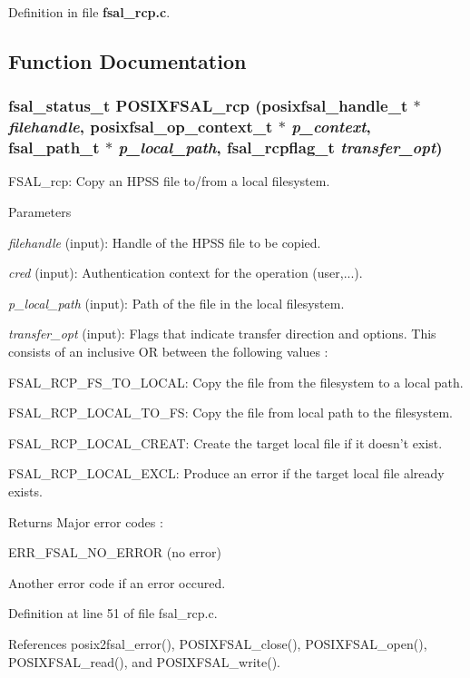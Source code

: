 Definition in file {\bf fsal\_\-rcp.c}.

\subsection{Function Documentation}
\subsubsection[{POSIXFSAL\_\-rcp}]{\setlength{\rightskip}{0pt plus 5cm}fsal\_\-status\_\-t POSIXFSAL\_\-rcp (posixfsal\_\-handle\_\-t $\ast$ {\em filehandle}, \/  posixfsal\_\-op\_\-context\_\-t $\ast$ {\em p\_\-context}, \/  fsal\_\-path\_\-t $\ast$ {\em p\_\-local\_\-path}, \/  fsal\_\-rcpflag\_\-t {\em transfer\_\-opt})}\label{fsal__rcp_8c_aaca81037c1994935b9526f730dd8ea38}
FSAL\_\-rcp: Copy an HPSS file to/from a local filesystem.


\begin{DoxyParams}{Parameters}
\item[{\em filehandle}](input): Handle of the HPSS file to be copied. \item[{\em cred}](input): Authentication context for the operation (user,...). \item[{\em p\_\-local\_\-path}](input): Path of the file in the local filesystem. \item[{\em transfer\_\-opt}](input): Flags that indicate transfer direction and options. This consists of an inclusive OR between the following values :
\begin{DoxyItemize}
\item FSAL\_\-RCP\_\-FS\_\-TO\_\-LOCAL: Copy the file from the filesystem to a local path.
\item FSAL\_\-RCP\_\-LOCAL\_\-TO\_\-FS: Copy the file from local path to the filesystem.
\item FSAL\_\-RCP\_\-LOCAL\_\-CREAT: Create the target local file if it doesn't exist.
\item FSAL\_\-RCP\_\-LOCAL\_\-EXCL: Produce an error if the target local file already exists.
\end{DoxyItemize}\end{DoxyParams}
\begin{DoxyReturn}{Returns}
Major error codes :
\begin{DoxyItemize}
\item ERR\_\-FSAL\_\-NO\_\-ERROR (no error)
\item Another error code if an error occured. 
\end{DoxyItemize}
\end{DoxyReturn}


Definition at line 51 of file fsal\_\-rcp.c.

References posix2fsal\_\-error(), POSIXFSAL\_\-close(), POSIXFSAL\_\-open(), POSIXFSAL\_\-read(), and POSIXFSAL\_\-write().